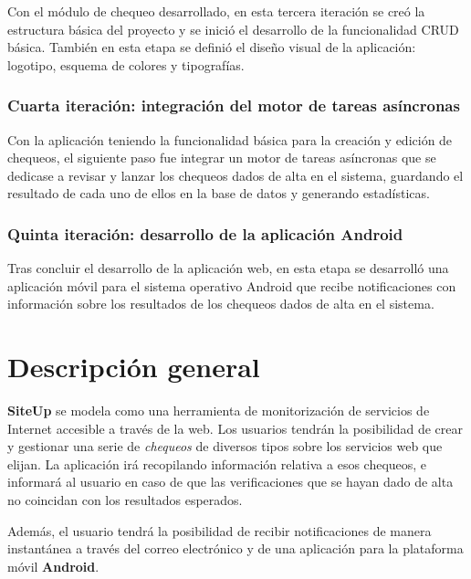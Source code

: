 \documentclass[a4paper,12pt]{article}
\begin{document}
Con el módulo de chequeo desarrollado, en esta tercera iteración se creó la
estructura básica del proyecto y se inició el desarrollo de la funcionalidad
CRUD básica. También en esta etapa se definió el diseño visual de la aplicación:
logotipo, esquema de colores y tipografías.

\subsubsection{Cuarta iteración: integración del motor de tareas asíncronas}

Con la aplicación teniendo la funcionalidad básica para la creación y edición de
chequeos, el siguiente paso fue integrar un motor de tareas asíncronas que se
dedicase a revisar y lanzar los chequeos dados de alta en el sistema, guardando
el resultado de cada uno de ellos en la base de datos y generando estadísticas.

\subsubsection{Quinta iteración: desarrollo de la aplicación Android}

Tras concluir el desarrollo de la aplicación web, en esta etapa se desarrolló
una aplicación móvil para el sistema operativo Android que recibe notificaciones
con información sobre los resultados de los chequeos dados de alta en el sistema.



\section{Descripción general}

\textbf{SiteUp} se modela como una herramienta de monitorización de servicios de
Internet accesible a través de la web. Los usuarios tendrán la posibilidad de
crear y gestionar una serie de \textit{chequeos} de diversos tipos sobre los
servicios web que elijan. La aplicación irá recopilando información relativa a
esos chequeos, e informará al usuario en caso de que las verificaciones que se
hayan dado de alta no coincidan con los resultados esperados.

Además, el usuario tendrá la posibilidad de recibir notificaciones de manera
instantánea a través del correo electrónico y de una aplicación para la
plataforma móvil \textbf{Android}. 
\end{document}
